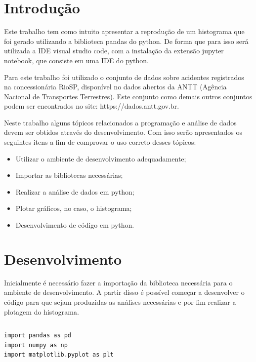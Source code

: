 \documentclass[a4paper, 12pt]{article}
\begin{document}
\newpage
{}
\section{Introdução}
Este trabalho tem como intuito apresentar a reprodução de um histograma que foi gerado utilizando a biblioteca pandas do python. De forma que para isso será utilizada a IDE visual studio code, com a instalação da extensão jupyter notebook, que consiste em uma IDE do python. 

Para este trabalho foi utilizado o conjunto de dados sobre acidentes registrados na concessionária RioSP, disponível no dados abertos da ANTT (Agência Nacional de Transportes Terrestres). 
Este conjunto como demais outros conjuntos podem ser encontrados no site: https://dados.antt.gov.br.

Neste trabalho alguns tópicos relacionados a programação e análise de dados devem ser obtidos através do desenvolvimento. Com isso serão apresentados os seguintes itens a fim de comprovar o uso correto desses tópicos:
\begin{itemize}
    \item Utilizar o ambiente de desenvolvimento adequadamente;
    \item Importar as bibliotecas necessárias;
    \item Realizar a análise de dados em python;
    \item Plotar gráficos, no caso, o histograma;
    \item Desenvolvimento de código em python.
\end{itemize}

\newpage
\section{Desenvolvimento}

Inicialmente é necessário fazer a importação da biblioteca necessária para o ambiente de desenvolvimento. A partir disso é possível começar a desenvolver o código para que sejam produzidas as análises necessárias e por fim realizar a plotagem do histograma.
\begin{tabular}{ccc}
\end{tabular}

\begin{lstlisting} 
import pandas as pd 
import numpy as np
import matplotlib.pyplot as plt 
\end{lstlisting}
\end{document}

